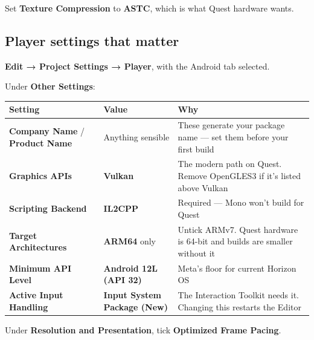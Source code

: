 \documentclass[11pt,a4paper]{article}
\begin{document}
Set \textbf{Texture Compression} to \textbf{ASTC}, which is what Quest hardware wants.

\subsection{Player settings that matter}\label{player-settings-that-matter}

\textbf{Edit → Project Settings → Player}, with the Android tab selected.

Under \textbf{Other Settings}:

\begin{longtable}[]{@{}
  >{\raggedright\arraybackslash}p{}
  >{\raggedright\arraybackslash}p{}
  >{\raggedright\arraybackslash}p{}@{}}
\toprule\noalign{}
\begin{minipage}[b]{\linewidth}\raggedright
Setting
\end{minipage} & \begin{minipage}[b]{\linewidth}\raggedright
Value
\end{minipage} & \begin{minipage}[b]{\linewidth}\raggedright
Why
\end{minipage} \\
\midrule\noalign{}
\endhead
\bottomrule\noalign{}
\endlastfoot
\textbf{Company Name} / \textbf{Product Name} & Anything sensible & These generate your package name --- set them before your first build \\
\textbf{Graphics APIs} & \textbf{Vulkan} & The modern path on Quest. Remove OpenGLES3 if it's listed above Vulkan \\
\textbf{Scripting Backend} & \textbf{IL2CPP} & Required --- Mono won't build for Quest \\
\textbf{Target Architectures} & \textbf{ARM64} only & Untick ARMv7. Quest hardware is 64-bit and builds are smaller without it \\
\textbf{Minimum API Level} & \textbf{Android 12L (API 32)} & Meta's floor for current Horizon OS \\
\textbf{Active Input Handling} & \textbf{Input System Package (New)} & The Interaction Toolkit needs it. Changing this restarts the Editor \\
\end{longtable}

Under \textbf{Resolution and Presentation}, tick \textbf{Optimized Frame Pacing}.
\end{document}
